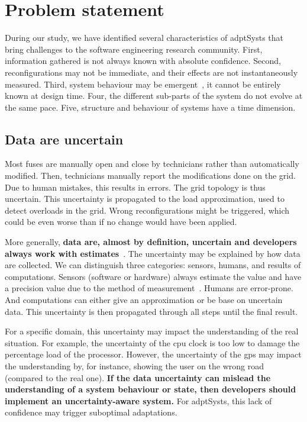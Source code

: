 \section{Problem statement}

During our study, we have identified several characteristics of \glspl{adptSyst} that bring challenges to the software engineering research community.
First, information gathered is not always known with absolute confidence.
Second, reconfigurations may not be immediate, and their effects are not instantaneously measured.
Third, system behaviour may be emergent~\cite{zio2011uncertainties}, \ie it cannot be entirely known at design time.
Four, the different sub-parts of the system do not evolve at the same pace.
Five, structure and behaviour of systems have a time dimension.


\subsection{Data are uncertain}
Most fuses are manually open and close by technicians rather than automatically modified.
Then, technicians manually report the modifications done on the grid.
Due to human mistakes, this results in errors.
The grid topology is thus uncertain.
This uncertainty is propagated to the load approximation, used to detect overloads in the grid.
Wrong reconfigurations might be triggered, which could be even worse than if no change would have been applied.

More generally, \textbf{data are, almost by definition, uncertain and developers always work with estimates}~\cite{DBLP:conf/asplos/BornholtMM14, metrology2008evaluation, DBLP:journals/tkde/AggarwalY09}.
The uncertainty may be explained by how data are collected.
We can distinguish three categories: sensors, humans, and results of computations.
Sensors (software or hardware) always estimate the value and have a precision value due to the method of measurement~\cite{metrology2008evaluation, DBLP:conf/asplos/BornholtMM14}.
Humans are error-prone.
And computations can either give an approximation or be base on uncertain data.
This uncertainty is then propagated through all steps until the final result.

For a specific domain, this uncertainty may impact the understanding of the real situation.
For example, the uncertainty of the \gls{cpu} clock is too low to damage the percentage load of the processor.
However, the uncertainty of the \gls{gps} may impact the understanding by, for instance, showing the user on the wrong road (compared to the real one).
\textbf{If the data uncertainty can mislead the understanding of a system behaviour or state, then developers should implement an uncertainty-aware system.}
For \glspl{adptSyst}, this lack of confidence may trigger suboptimal adaptations.


